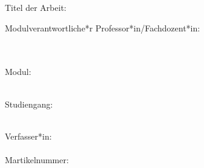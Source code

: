 \begin{titlepage}
    \Huge\textbf{\myThesisType}
    \vspace{1cm}

    \normalsize Titel der Arbeit: \\
    \Large\textbf{\myTitle}

    \vfill

    \normalsize
    Modulverantwortliche*r Professor*in/Fachdozent*in: \\
    \myProfessor \\
    \myUniversity \\
    \vspace{1cm}

    Modul: \\
    \myModule \\
    \vspace{1cm}

    Studiengang: \\
    \myCourse \\
    \vspace{1cm}

    Verfasser*in: \\
    \myAuthor \\
    Martikelnummer: \myId

\end{titlepage}